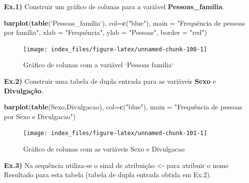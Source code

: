 \documentclass[12pt,brazil,oneside]{book}
\newenvironment{Shaded}{\begin{snugshade}}{\end{snugshade}}
\newcommand{\DataTypeTok}[1]{\textcolor[rgb]{0.13,0.29,0.53}{#1}}
\newcommand{\KeywordTok}[1]{\textcolor[rgb]{0.13,0.29,0.53}{\textbf{#1}}}
\newcommand{\NormalTok}[1]{#1}
\newcommand{\StringTok}[1]{\textcolor[rgb]{0.31,0.60,0.02}{#1}}
\begin{document}
\textbf{Ex.1)} Construir um gráfico de colunas para a variável \textbf{Pessoas\_familia}.

\begin{Shaded}
\begin{Highlighting}[]
\KeywordTok{barplot}\NormalTok{(}\KeywordTok{table}\NormalTok{(}\StringTok{`}\DataTypeTok{Pessoas_familia}\StringTok{`}\NormalTok{), }\DataTypeTok{col=}\KeywordTok{c}\NormalTok{(}\StringTok{"blue"}\NormalTok{), }
        \DataTypeTok{main =} \StringTok{"Frequência de pessoas por família"}\NormalTok{, }
        \DataTypeTok{xlab =} \StringTok{"Frequência", }
\StringTok{        ylab = "}\NormalTok{Pessoas}\StringTok{", }
\StringTok{        border = "}\NormalTok{red}\StringTok{")}
\end{Highlighting}
\end{Shaded}

\begin{figure}[H]

{\centering \texttt{[image: index\_files/figure-latex/unnamed-chunk-100-1]} 

}

\caption{Gráfico de colunas com a variável `Pessoas familia`}\label{fig:unnamed-chunk-100}
\end{figure}

\textbf{Ex.2)} Construir uma tabela de dupla entrada para as variáveis \textbf{Sexo} e \textbf{Divulgação}.

\begin{Shaded}
\begin{Highlighting}[]
\KeywordTok{barplot}\NormalTok{(}\KeywordTok{table}\NormalTok{(Sexo,Divulgacao), }
        \DataTypeTok{col=}\KeywordTok{c}\NormalTok{(}\StringTok{"blue"}\NormalTok{), }
        \DataTypeTok{main =} \StringTok{"Frequência de pessoas por Sexo e Divulgacao"}\NormalTok{)}
\end{Highlighting}
\end{Shaded}

\begin{figure}[H]

{\centering \texttt{[image: index\_files/figure-latex/unnamed-chunk-101-1]} 

}

\caption{Gráfico de colunas com as variáveis Sexo e Divulgacao}\label{fig:unnamed-chunk-101}
\end{figure}

\textbf{Ex.3)} Na sequência utiliza-se o sinal de atribuição \textless{}- para atribuir o nome Resultado para esta tabela (tabela de dupla entrada obtida em Ex.2).
\end{document}
